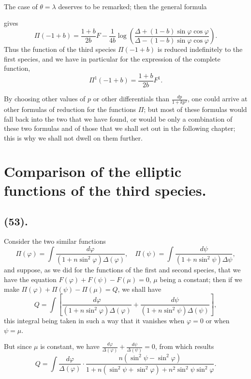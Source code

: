 \documentclass{article}
\begin{document}
The case of $\theta=\lambda$ deserves to be remarked; then the general formula

gives
\[ \Pi(-1+b)=\frac{1+b}{2b}F-\frac{1}{4b}\log\left(\frac{\Delta+(1-b)\sin\varphi\cos\varphi}{\Delta-(1-b)\sin\varphi\cos\varphi}\right). \]
Thus the function of the third species $\Pi(-1+b)$ is reduced indefinitely to the first species, and we have in particular for the expression of the complete function,
\[ \Pi^{1}(-1+b)=\frac{1+b}{2b}F^{1}. \]

By choosing other values of $p$ or other differentials than $\frac{dp}{1+kp^{2}}$, one could arrive at other formulas of reduction for the functions $\Pi$; but most of these formulas would fall back into the two that we have found, or would be only a combination of these two formulas and of those that we shall set out in the following chapter; this is why we shall not dwell on them further.

\section*{Comparison of the elliptic functions of the third species.}

\subsection*{(53).}

Consider the two similar functions
\[ \Pi(\varphi)=\int\frac{d\varphi}{(1+n\sin^{2}\varphi)\Delta(\varphi)},\quad \Pi(\psi)=\int\frac{d\psi}{(1+n\sin^{2}\psi)\Delta\psi}, \]
and suppose, as we did for the functions of the first and second species, that we have the equation $F(\varphi)+F(\psi)-F(\mu)=0$, $\mu$ being a constant; then if we make $\Pi(\varphi)+\Pi(\psi)-\Pi(\mu)=Q$, we shall have
\[ Q=\int\left[\frac{d\varphi}{(1+n\sin^{2}\varphi)\Delta(\varphi)}+\frac{d\psi}{(1+n\sin^{2}\psi)\Delta(\psi)}\right], \]
this integral being taken in such a way that it vanishes when $\varphi=0$ or when $\psi=\mu$.

But since $\mu$ is constant, we have $\frac{d\varphi}{\Delta(\varphi)}+\frac{d\psi}{\Delta(\psi)}=0$, from which results
\[ Q=\int\frac{d\varphi}{\Delta(\varphi)}\cdot\frac{n(\sin^{2}\psi-\sin^{2}\varphi)}{1+n(\sin^{2}\psi+\sin^{2}\varphi)+n^{2}\sin^{2}\psi\sin^{2}\varphi}. \]
\end{document}

